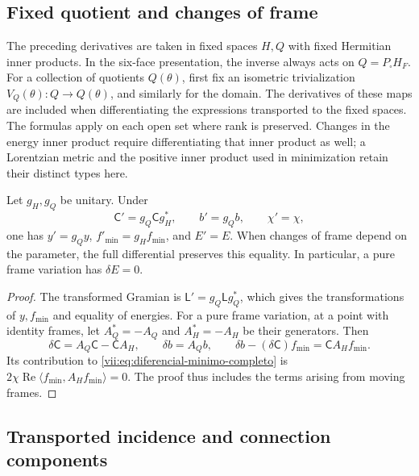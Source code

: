\subsection{Fixed quotient and changes of frame}
\label{vii:subsec:marcos-minimo}

The preceding derivatives are taken in fixed spaces \(H,Q\) with
fixed Hermitian inner products. In the six-face presentation, the
inverse always acts on \(Q=P_\square H_F\). For a collection of
quotients \(Q(\theta)\), first fix an isometric trivialization
\(V_Q(\theta):Q\to Q(\theta)\), and similarly for the domain.
The derivatives of these maps are included when differentiating the
expressions transported to the fixed spaces. The formulas apply on
each open set where rank is preserved. Changes in the energy inner
product require differentiating that inner product as well; a
Lorentzian metric and the positive inner product used in minimization
retain their distinct types here.

\begin{proposition}
\label{vii:prop:covariancia-minimo}
Let \(g_H,g_Q\) be unitary. Under
\[
 \mathsf C'=g_Q\mathsf C g_H^*,\qquad b'=g_Qb,\qquad \chi'=\chi,
\]
one has \(y'=g_Qy\), \(f'_{\min}=g_Hf_{\min}\), and \(E'=E\).
When changes of frame depend on the parameter, the full differential
preserves this equality. In particular, a pure frame variation has
\(\delta E=0\).
\end{proposition}

\begin{proof}
The transformed Gramian is \(\mathsf L'=g_Q\mathsf Lg_Q^*\),
which gives the transformations of \(y,f_{\min}\) and equality
of energies. For a pure frame variation, at a point with identity
frames, let \(A_Q^*=-A_Q\) and \(A_H^*=-A_H\) be their
generators. Then
\[
 \delta\mathsf C=A_Q\mathsf C-\mathsf C A_H,\qquad
 \delta b=A_Qb,\qquad
 \delta b-(\delta\mathsf C)f_{\min}=\mathsf C A_Hf_{\min}.
\]
Its contribution to \eqref{vii:eq:diferencial-minimo-completo} is
\(2\chi\operatorname{Re}\langle f_{\min},A_Hf_{\min}\rangle=0\).
The proof thus includes the terms arising from moving frames.
\end{proof}

\subsection{Transported incidence and connection components}
\label{vii:subsec:incidencia-conexion-minima}

